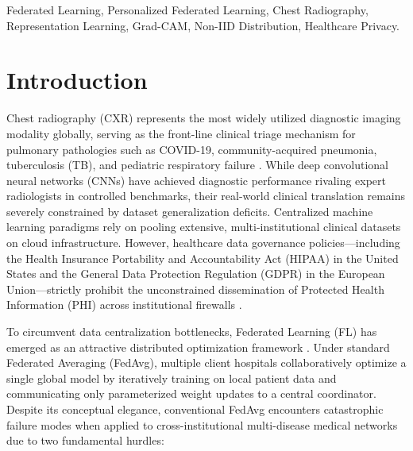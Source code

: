 \documentclass[conference]{IEEEtran}
\begin{document}
\begin{IEEEkeywords}
Federated Learning, Personalized Federated Learning, Chest Radiography, Representation Learning, Grad-CAM, Non-IID Distribution, Healthcare Privacy.
\end{IEEEkeywords}

\section{Introduction}
Chest radiography (CXR) represents the most widely utilized diagnostic imaging modality globally, serving as the front-line clinical triage mechanism for pulmonary pathologies such as COVID-19, community-acquired pneumonia, tuberculosis (TB), and pediatric respiratory failure \cite{kermany2018identifying, chowdhury2020can}. While deep convolutional neural networks (CNNs) have achieved diagnostic performance rivaling expert radiologists in controlled benchmarks, their real-world clinical translation remains severely constrained by dataset generalization deficits. Centralized machine learning paradigms rely on pooling extensive, multi-institutional clinical datasets on cloud infrastructure. However, healthcare data governance policies---including the Health Insurance Portability and Accountability Act (HIPAA) in the United States and the General Data Protection Regulation (GDPR) in the European Union---strictly prohibit the unconstrained dissemination of Protected Health Information (PHI) across institutional firewalls \cite{rieke2020future, kaissis2020secure}.

To circumvent data centralization bottlenecks, Federated Learning (FL) has emerged as an attractive distributed optimization framework \cite{mcmahan2017communication}. Under standard Federated Averaging (FedAvg), multiple client hospitals collaboratively optimize a single global model by iteratively training on local patient data and communicating only parameterized weight updates to a central coordinator. Despite its conceptual elegance, conventional FedAvg encounters catastrophic failure modes when applied to cross-institutional multi-disease medical networks due to two fundamental hurdles:
\end{document}
